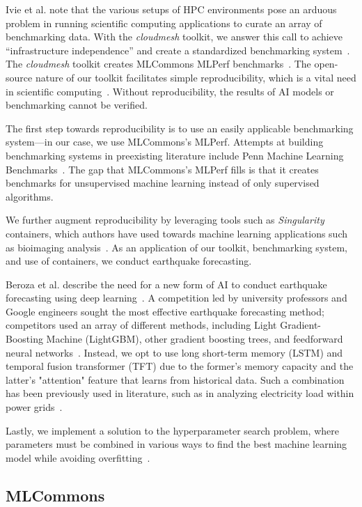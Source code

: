 \documentclass[utf8]{FrontiersinVancouver} %
\begin{document}
Ivie et al. note that the various setups of HPC environments pose an arduous problem in running scientific computing applications to curate an array of benchmarking data. With the {\em cloudmesh} toolkit, we answer this call to achieve ``infrastructure independence'' and create a standardized benchmarking system~\cite{ivie}. The {\em cloudmesh} toolkit creates MLCommons MLPerf benchmarks~\cite{reddi}. The open-source nature of our toolkit facilitates simple reproducibility, which is a vital need in scientific computing~\cite{leveque, bailey}. Without reproducibility, the results of AI models or benchmarking cannot be verified.

The first step towards reproducibility is to use an easily applicable benchmarking system---in our case, we use MLCommons's MLPerf. Attempts at building benchmarking systems in preexisting literature include Penn Machine Learning Benchmarks~\cite{romano}. The gap that MLCommons's MLPerf fills is that it creates benchmarks for unsupervised machine learning instead of only supervised algorithms.

We further augment reproducibility by leveraging tools such as {\em Singularity} containers, which authors have used towards machine learning applications such as bioimaging analysis~\cite{mitra}. As an application of our toolkit, benchmarking system, and use of containers, we conduct earthquake forecasting.

Beroza et al. describe the need for a new form of AI to conduct earthquake forecasting using deep learning~\cite{beroza}. A competition led by university professors and Google engineers sought the most effective earthquake forecasting method; competitors used an array of different methods, including Light Gradient-Boosting Machine (LightGBM), other gradient boosting trees, and feedforward neural networks~\cite{johnson}. Instead, we opt to use long short-term memory (LSTM) and temporal fusion transformer (TFT) due to the former's memory capacity and the latter's "attention" feature that learns from historical data. Such a combination has been previously used in literature, such as in analyzing electricity load within power grids~\cite{giacomazzi}.

Lastly, we implement a solution to the hyperparameter search problem, where parameters must be combined in various ways to find the best machine learning model while avoiding overfitting~\cite{claesen}.

\subsection{MLCommons}
\label{sec:mlcommons}
\end{document}
